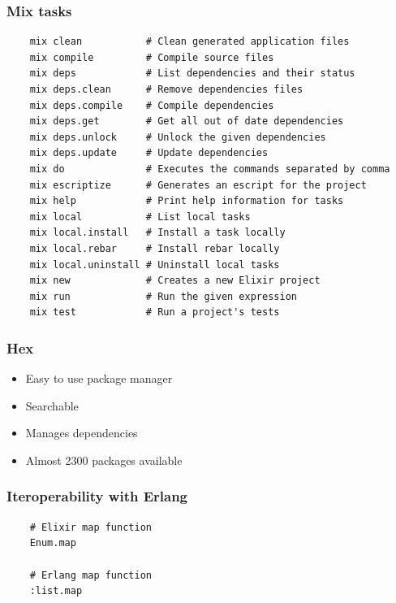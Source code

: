 \documentclass{beamer}
\begin{document}
\begin{frame}[fragile]
  \frametitle{Mix tasks}
  \footnotesize{
\begin{verbatim}
    mix clean           # Clean generated application files
    mix compile         # Compile source files
    mix deps            # List dependencies and their status
    mix deps.clean      # Remove dependencies files
    mix deps.compile    # Compile dependencies
    mix deps.get        # Get all out of date dependencies
    mix deps.unlock     # Unlock the given dependencies
    mix deps.update     # Update dependencies
    mix do              # Executes the commands separated by comma
    mix escriptize      # Generates an escript for the project
    mix help            # Print help information for tasks
    mix local           # List local tasks
    mix local.install   # Install a task locally
    mix local.rebar     # Install rebar locally
    mix local.uninstall # Uninstall local tasks
    mix new             # Creates a new Elixir project
    mix run             # Run the given expression
    mix test            # Run a project's tests
\end{verbatim}
  }
\end{frame}

\begin{frame}
  \frametitle{Hex}
  \begin{itemize}
  \item Easy to use package manager
  \item Searchable
  \item Manages dependencies
  \item Almost 2300 packages available
  \end{itemize}
\end{frame}

\begin{frame}[fragile]
  \frametitle{Iteroperability with Erlang}
  \begin{lstlisting}
    # Elixir map function
    Enum.map

    # Erlang map function
    :list.map
  \end{lstlisting}
\end{frame}
\end{document}
